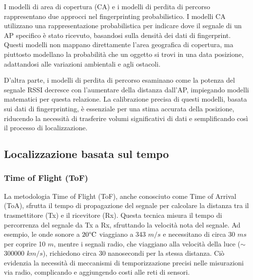 I modelli di area di copertura (CA) e i modelli di perdita di percorso rappresentano due approcci nel fingerprinting probabilistico. I modelli CA utilizzano una rappresentazione probabilistica per indicare dove il segnale di un AP specifico è stato ricevuto, basandosi sulla densità dei dati di fingerprint. Questi modelli non mappano direttamente l'area geografica di copertura, ma piuttosto modellano la probabilità che un oggetto si trovi in una data posizione, adattandosi alle variazioni ambientali e agli ostacoli.

D'altra parte, i modelli di perdita di percorso esaminano come la potenza del segnale RSSI decresce con l'aumentare della distanza dall'AP, impiegando modelli matematici per questa relazione. La calibrazione precisa di questi modelli, basata sui dati di fingerprinting, è essenziale per una stima accurata della posizione, riducendo la necessità di trasferire volumi significativi di dati e semplificando così il processo di localizzazione.

\subsection{Localizzazione basata sul tempo}

\subsubsection{Time of Flight (ToF)}

\hspace{\parindent}La metodologia Time of Flight (ToF), anche conosciuto come Time of Arrival (ToA), sfrutta il tempo di propagazione del segnale per calcolare la distanza tra il trasmettitore (Tx) e il ricevitore (Rx). Questa tecnica misura il tempo di percorrenza del segnale da Tx a Rx, sfruttando la velocità nota del segnale. Ad esempio, le onde sonore a $20 \degree \text{C}$ viaggiano a 343 $\displaystyle{m/s}$ e necessitano di circa 30 $ms$ per coprire 10 $m$, mentre i segnali radio, che viaggiano alla velocità della luce ($\sim$ \num{300000} $\displaystyle{km/s}$), richiedono circa 30 nanosecondi per la stessa distanza. Ciò evidenzia la necessità di meccanismi di temporizzazione precisi nelle misurazioni via radio, complicando e aggiungendo costi alle reti di sensori.


